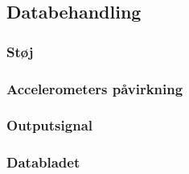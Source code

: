 \subsection{Databehandling}
\subsubsection{Støj}
\subsubsection{Accelerometers påvirkning}
\subsubsection{Outputsignal}
\subsubsection{Databladet}